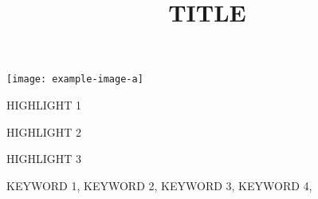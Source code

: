








\clearpage

\begin{frontmatter}



\title{TITLE}

    

    \begin{abstract}
      


           


    \end{abstract}

    \begin{graphicalabstract}
        \texttt{[image: example-image-a]}
    \end{graphicalabstract}

    \begin{highlights}
	\item HIGHLIGHT 1%
		\item HIGHLIGHT 2%
			\item HIGHLIGHT 3%
    \end{highlights}

    \begin{keyword}
        KEYWORD 1\sep
    KEYWORD 2\sep
       KEYWORD 3\sep
       KEYWORD 4\sep
    \end{keyword}

\end{frontmatter}

